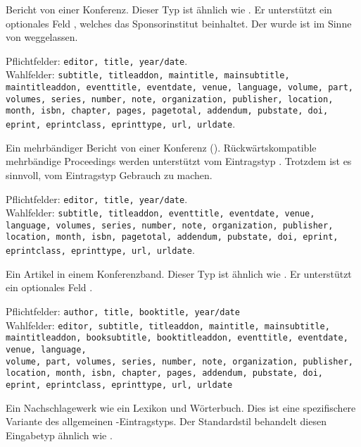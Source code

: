\documentclass{ltxdockit}[2011/03/25]
\begin{document}
\begin{typelist}

Bericht von einer Konferenz. Dieser Typ ist ähnlich wie
. Er unterstützt ein optionales Feld
, welches das Sponsorinstitut beinhaltet. Der
 wurde ist im Sinne von  weggelassen. 

Pflichtfelder: \texttt{editor, title, year/date}.
\\ Wahlfelder: \texttt{subtitle, titleaddon, 
maintitle,
mainsubtitle, maintitleaddon, eventtitle, eventdate, venue, language, volume,
part, volumes, series, number, note, organization, publisher, location, month,
isbn, chapter, pages, pagetotal, addendum, pubstate, doi, eprint, eprintclass,
eprint\-type, url, urldate}.


Ein mehrbändiger Bericht von einer Konferenz 
(). Rückwärtskompatible
mehrbändige Proceedings werden unterstützt vom Eintragstyp
. Trotzdem ist es sinnvoll, vom Eintragstyp
 Gebrauch zu machen.

Pflichtfelder: \texttt{editor, title, year/date}.\\
Wahlfelder: \texttt{subtitle, titleaddon, eventtitle, eventdate, venue,
language, volumes, series, number, note, organization, publisher, location,
month, isbn, pagetotal, addendum, pubstate, doi, eprint, eprintclass,
eprinttype, url, urldate}.



Ein Artikel in einem Konferenzband. Dieser Typ ist ähnlich wie
. Er unterstützt ein optionales Feld
. 

Pflichtfelder: \texttt{author, title, booktitle, year/date}\\
Wahlfelder: \texttt{editor, subtitle,
titleaddon, maintitle, mainsubtitle, maintitleaddon, booksubtitle,
booktitleaddon, eventtitle, eventdate, venue, language,\\ volume, part, volumes,
series, number, note, organization, publisher,\\ location, month, isbn, chapter,
pages, addendum, pubstate, doi, eprint, eprintclass, eprinttype, url, urldate}


Ein Nachschlagewerk wie ein Lexikon und Wörterbuch. Dies ist eine spezifischere
Variante des allgemeinen -Eintragstyps. Der Standardstil
behandelt diesen Eingabetyp ähnlich wie .


\end{typelist}
\end{document}
